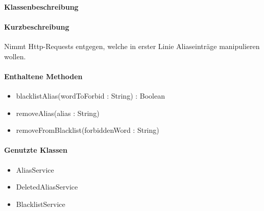\paragraph*{Klassenbeschreibung}%
\paragraph*{Kurzbeschreibung}
Nimmt Http-Requests entgegen, welche in erster Linie Aliaseinträge manipulieren wollen.
\paragraph*{Enthaltene Methoden}
\begin{itemize}
    \item blacklistAlias(wordToForbid : String) : Boolean
    \item removeAlias(alias : String)
    \item removeFromBlacklist(forbiddenWord : String)
\end{itemize}
\paragraph*{Genutzte Klassen}
\begin{itemize}
    \item AliasService
    \item DeletedAliasService
    \item BlacklistService
\end{itemize}